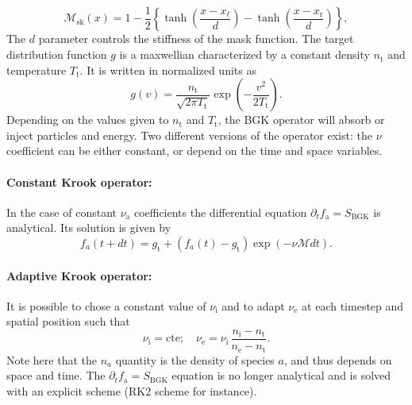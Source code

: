 \documentclass[11pt]{article}
\begin{document}
%
\begin{equation}\label{eq:mask_sink}
 \mathcal{M}_\mathrm{sk}(x) = 1 - \dfrac{1}{2}\left\{ \operatorname{tanh}{\left(\dfrac{x-x_\mathrm{\ell}}{d}\right)} - \operatorname{tanh}{\left(\dfrac{x-x_\mathrm{r}}{d}\right)}  \right\},
\end{equation}
%
%
The $d$ parameter controls the stiffness of the mask function. The target distribution function $g$ is a maxwellian characterized by a constant density $n_\mathrm{t}$ and temperature $T_\mathrm{t}$. It is written in normalized units as 
\[ g(v) = \dfrac{n_\mathrm{t}}{\sqrt{2\pi T_\mathrm{t}} } \operatorname{exp} \left( - \dfrac{v^2}{2 T_\mathrm{t}}  \right). \]
Depending on the values given to $n_\mathrm{t}$ and $T_\mathrm{t}$, the BGK operator will absorb or inject particles and energy. Two different versions of the operator exist: the $\nu$ coefficient can be either constant, or depend on the time and space variables.

\paragraph{Constant Krook operator:} In the case of constant $\nu_\mathrm{a}$ coefficients the differential equation $\partial_t f_\mathrm{a}  = S_\mathrm{BGK}$ is analytical. Its solution is given by
\[ f_a(t+dt) = g_\mathrm{t} + (f_a(t) - g_\mathrm{t})\operatorname{exp} \left( - \nu \mathcal{M} dt \right). \]

\paragraph{Adaptive Krook operator:} It is possible to chose a constant value of $\nu_\mathrm{i}$ and to adapt $\nu_\mathrm{e}$ at each timestep and spatial position such that
\[ \nu_{\mathrm{i}} = \mathrm{cte}; \quad \nu_{\mathrm{e}} = \nu_{\mathrm{i}}\, \dfrac{n_\mathrm{i} - n_\mathrm{t}}{ n_\mathrm{e} - n_\mathrm{t}}. \]
Note here that the $n_a$ quantity is the density of species $a$, and thus depends on space and time. The $\partial_t f_\mathrm{a}  = S_\mathrm{BGK}$ equation is no longer analytical and is solved with an explicit scheme (RK2 scheme for instance).
\end{document}
